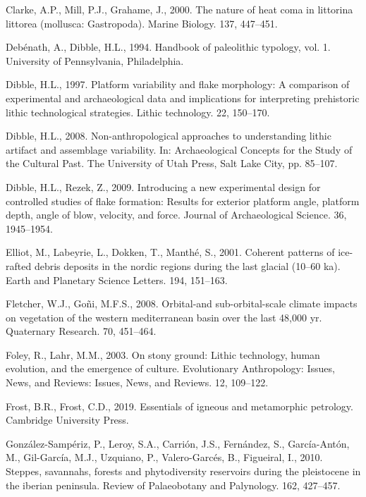 \documentclass[12pt,twoside]{reedthesis}
\begin{document}
\leavevmode\hypertarget{ref-clarke2000}{}%
Clarke, A.P., Mill, P.J., Grahame, J., 2000. The nature of heat coma in littorina littorea (mollusca: Gastropoda). Marine Biology. 137, 447--451.

\leavevmode\hypertarget{ref-debenath1994}{}%
Debénath, A., Dibble, H.L., 1994. Handbook of paleolithic typology, vol. 1. University of Pennsylvania, Philadelphia.

\leavevmode\hypertarget{ref-dibble1997}{}%
Dibble, H.L., 1997. Platform variability and flake morphology: A comparison of experimental and archaeological data and implications for interpreting prehistoric lithic technological strategies. Lithic technology. 22, 150--170.

\leavevmode\hypertarget{ref-dibble2008}{}%
Dibble, H.L., 2008. Non-anthropological approaches to understanding lithic artifact and assemblage variability. In: Archaeological Concepts for the Study of the Cultural Past. The University of Utah Press, Salt Lake City, pp. 85--107.

\leavevmode\hypertarget{ref-dibble2009}{}%
Dibble, H.L., Rezek, Z., 2009. Introducing a new experimental design for controlled studies of flake formation: Results for exterior platform angle, platform depth, angle of blow, velocity, and force. Journal of Archaeological Science. 36, 1945--1954.

\leavevmode\hypertarget{ref-elliot2001}{}%
Elliot, M., Labeyrie, L., Dokken, T., Manthé, S., 2001. Coherent patterns of ice-rafted debris deposits in the nordic regions during the last glacial (10--60 ka). Earth and Planetary Science Letters. 194, 151--163.

\leavevmode\hypertarget{ref-fletcher2008}{}%
Fletcher, W.J., Goñi, M.F.S., 2008. Orbital-and sub-orbital-scale climate impacts on vegetation of the western mediterranean basin over the last 48,000 yr. Quaternary Research. 70, 451--464.

\leavevmode\hypertarget{ref-foley2003}{}%
Foley, R., Lahr, M.M., 2003. On stony ground: Lithic technology, human evolution, and the emergence of culture. Evolutionary Anthropology: Issues, News, and Reviews: Issues, News, and Reviews. 12, 109--122.

\leavevmode\hypertarget{ref-frost2019}{}%
Frost, B.R., Frost, C.D., 2019. Essentials of igneous and metamorphic petrology. Cambridge University Press.

\leavevmode\hypertarget{ref-gonzalez-samperiz2010}{}%
González-Sampériz, P., Leroy, S.A., Carrión, J.S., Fernández, S., García-Antón, M., Gil-García, M.J., Uzquiano, P., Valero-Garcés, B., Figueiral, I., 2010. Steppes, savannahs, forests and phytodiversity reservoirs during the pleistocene in the iberian peninsula. Review of Palaeobotany and Palynology. 162, 427--457.
\end{document}
